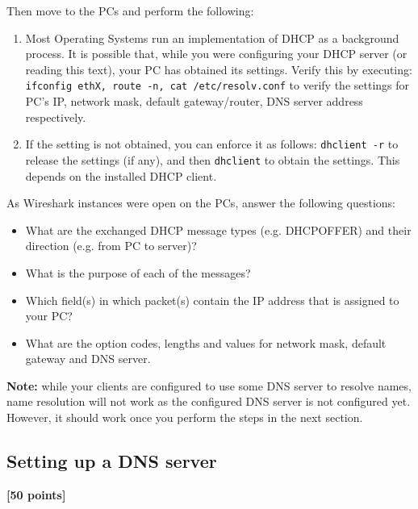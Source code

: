 \documentclass[pdftex,12pt,a4paper]{article}
\begin{document}
            Then move to the PCs and perform the following:
            \begin{enumerate}
                \item Most Operating Systems run an implementation of DHCP as a
                    background process. It is possible that, while you were
                    configuring your DHCP server (or reading this text), your
                    PC has obtained its settings. Verify this by executing:
                    \texttt{ifconfig ethX, route -n, cat /etc/resolv.conf} to
                    verify the settings for PC's IP, network mask, default
                    gateway/router, DNS server address respectively.

                \item If the setting is not obtained, you can enforce it as
                    follows: \texttt{dhclient -r} to release the settings (if
                    any), and then \texttt{dhclient} to obtain the settings.
                    This depends on the installed DHCP client.
            \end{enumerate}

            As Wireshark instances were open on the PCs, answer the following
            questions:
            \begin{itemize}
                \item What are the exchanged DHCP message types (e.g.
                    DHCPOFFER) and their direction (e.g. from PC to server)?
                \item What is the purpose of each of the messages?
                \item Which field(s) in which packet(s) contain the IP address
                    that is assigned to your PC?
                \item What are the option codes, lengths and values for
                    network mask, default gateway and DNS server.
            \end{itemize}

            \textbf{Note:} while your clients are configured to use some DNS
            server to resolve names, name resolution will not work as the
            configured DNS server is not configured yet. However, it should
            work once you perform the steps in the next section.

        \subsection{Setting up a DNS server}
            \begin{flushright}
                \textbf{[50 points]}
            \end{flushright}
\end{document}
